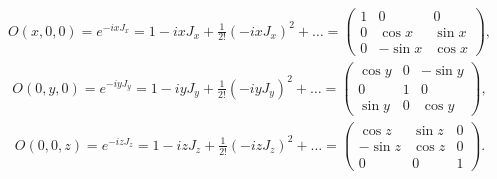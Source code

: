 \documentclass[11pt]{article}
\begin{document}
\begin{enumerate}
    \begin{eqnarray}
        O(x,0,0)= e^{-ixJ_x}= 1-ixJ_x+\frac{1}{2!} (-ixJ_x)^2+\dots=
        \begin{pmatrix}
            1& 0         & 0\\
            0&\cos x & \sin x\\
            0&-\sin x & \cos x 
        \end{pmatrix},
    \end{eqnarray}
   \begin{eqnarray}
        O(0,y,0)= e^{-iyJ_y}= 1-iyJ_y+\frac{1}{2!} (-iyJ_y)^2+\dots=
        \begin{pmatrix}
            \cos y& 0    & -\sin y\\
            0&1 & 0\\
            \sin y&0 & \cos y
        \end{pmatrix},
   \end{eqnarray}
   \begin{eqnarray}
    O(0,0,z)=e^{-izJ_z}= 1-izJ_z+\frac{1}{2!} (-izJ_z)^2+\dots=
    \begin{pmatrix}
        \cos z& \sin z    & 0\\
        -\sin z&\cos z & 0\\
       0 &0 & 1
    \end{pmatrix}.
    \end{eqnarray}
\end{enumerate}
\end{document}
